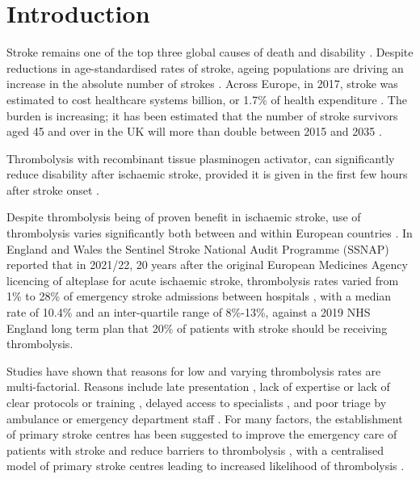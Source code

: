 \section{Introduction}



Stroke remains one of the top three global causes of death and disability \cite{feigin_global_2021}. Despite reductions in age-standardised rates of stroke, ageing populations are driving an increase in the absolute number of strokes \cite{feigin_global_2021}. Across Europe, in 2017, stroke was estimated to cost healthcare systems  billion, or 1.7\% of health expenditure \cite{luengo-fernandez_economic_2020}. The burden is increasing; it has been estimated that the number of stroke survivors aged 45 and over in the UK will more than double between 2015 and 2035 \cite{king_future_2020}.

Thrombolysis with recombinant tissue plasminogen activator, can significantly reduce disability after ischaemic stroke, provided it is given in the first few hours after stroke onset \cite{emberson_effect_2014}. 

Despite thrombolysis being of proven benefit in ischaemic stroke, use of thrombolysis varies significantly both between and within European countries \cite{aguiar_de_sousa_access_2019}. In England and Wales the Sentinel Stroke National Audit Programme (SSNAP) reported that in 2021/22, 20 years after the original European Medicines Agency licencing of alteplase for acute ischaemic stroke, thrombolysis rates varied from 1\% to 28\% of emergency stroke admissions between hospitals \cite{sentinel_national_stroke_audit_programme_ssnap_2022}, with a median rate of 10.4\% and an inter-quartile range of 8\%-13\%, against a 2019 NHS England long term plan that 20\% of patients with stroke should be receiving thrombolysis\cite{nhs_long_term_plan_2019}.


Studies have shown that reasons for low and varying thrombolysis rates are multi-factorial. Reasons include late presentation \cite{aguiar_de_sousa_access_2019}, lack of expertise \cite{aguiar_de_sousa_access_2019} or lack of clear protocols or training \cite{carter-jones_stroke_2011}, delayed access to specialists \cite{kamal_delays_2017}, and poor triage by ambulance or emergency department staff \cite{carter-jones_stroke_2011}. For many factors, the establishment of primary stroke centres has been suggested to improve the emergency care of patients with stroke and reduce barriers to thrombolysis \cite{carter-jones_stroke_2011}, with a centralised model of primary stroke centres leading to increased likelihood of thrombolysis \cite{lahr_proportion_2012, morris_impact_2014, hunter_impact_2013}. 

